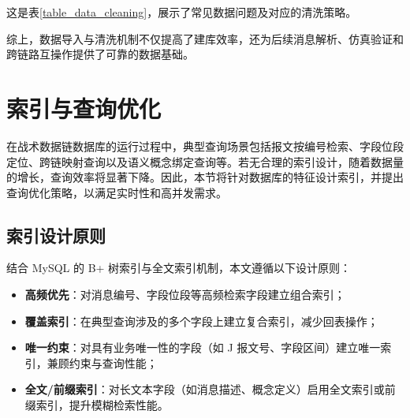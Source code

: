 这是表\ref{table_data_cleaning}，展示了常见数据问题及对应的清洗策略。

\begin{table}[!htb]
    \caption{常见数据问题与清洗策略}
    \label{table_data_cleaning}
    \centering
\end{table}

综上，数据导入与清洗机制不仅提高了建库效率，还为后续消息解析、仿真验证和跨链路互操作提供了可靠的数据基础。

\section{索引与查询优化}

在战术数据链数据库的运行过程中，典型查询场景包括报文按编号检索、字段位段定位、跨链映射查询以及语义概念绑定查询等。若无合理的索引设计，随着数据量的增长，查询效率将显著下降。因此，本节将针对数据库的特征设计索引，并提出查询优化策略，以满足实时性和高并发需求。

\subsection{索引设计原则}
结合 MySQL 的 B+ 树索引与全文索引机制，本文遵循以下设计原则：
\begin{itemize}
  \item \textbf{高频优先}：对消息编号、字段位段等高频检索字段建立组合索引；
  \item \textbf{覆盖索引}：在典型查询涉及的多个字段上建立复合索引，减少回表操作；
  \item \textbf{唯一约束}：对具有业务唯一性的字段（如 J 报文号、字段区间）建立唯一索引，兼顾约束与查询性能；
  \item \textbf{全文/前缀索引}：对长文本字段（如消息描述、概念定义）启用全文索引或前缀索引，提升模糊检索性能。
\end{itemize}

